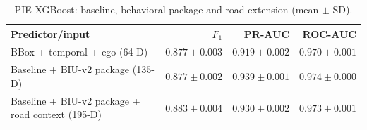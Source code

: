 \begin{table}[!htbp]
\centering
\caption{PIE XGBoost: baseline, behavioral package and road extension (mean $\pm$ SD).}\label{tab:ch4_architecture}
\begin{tabularx}{\textwidth}{@{}Xrrr@{}}\toprule
\textbf{Predictor/input} & \textbf{\boldmath $F_1$} & \textbf{PR-AUC} & \textbf{ROC-AUC} \\[3pt]
\midrule
BBox + temporal + ego (\mbox{64-D}) & $0.877\pm0.003$ & $0.919\pm0.002$ & $0.970\pm0.001$\\[3pt]
Baseline + BIU-v2 package (\mbox{135-D}) & $0.877\pm0.002$ & $\mathbf{0.939}\pm0.001$ & $\mathbf{0.974}\pm0.000$\\[3pt]
Baseline + BIU-v2 package + road context (\mbox{195-D}) & $\mathbf{0.883}\pm0.004$ & $0.930\pm0.002$ & $0.973\pm0.001$\\[3pt]
\bottomrule
\end{tabularx}
\end{table}

